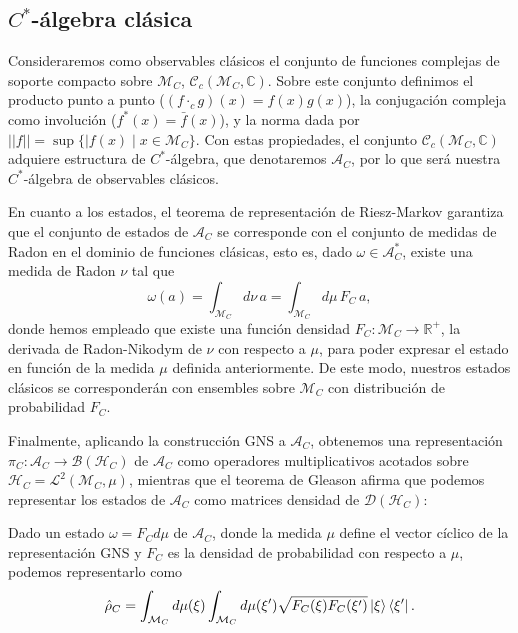 \documentclass[openany, 11pt]{book}
\numberwithin{equation}{chapter}
\newcommand{\Hc}{\mathcal H_C}
\newcommand{\Ac}{\mathcal A_C}
\newcommand{\Mc}{\mathcal M_C}
\begin{document}
\subsection{$C^*$-álgebra clásica}

Consideraremos como observables clásicos el conjunto de funciones complejas de soporte compacto sobre $\Mc$, $\mathcal C_c(\Mc, \mathbb C)$. Sobre este conjunto definimos 
el producto punto a punto ($(f\cdot_c g)(x) = f(x)g(x)$), la conjugación compleja como involución ($f^*(x) = \bar f(x)$), y la norma dada por $||f|| = \sup\{|f(x) \mid x\in\Mc\}$. 
Con estas propiedades, el conjunto $\mathcal C_c(\Mc, \mathbb C)$ adquiere estructura de $C^*$-álgebra, que denotaremos $\Ac$, por lo que será nuestra $C^*$-álgebra de observables clásicos. 

En cuanto a los estados, el teorema de representación de Riesz-Markov garantiza que el conjunto de estados de $\Ac$ se corresponde con el conjunto de medidas de Radon en el dominio de funciones clásicas, 
esto es, dado $\omega\in\Ac^*$, existe una medida de Radon $\nu$ tal que \begin{equation}
    \omega(a) = \int_{\Mc} d\nu \, a =\int_{\Mc} d\mu \, F_C \, a, 
\end{equation}donde hemos empleado que existe una función densidad $F_C:\Mc \to\mathbb R^+$, la derivada de Radon-Nikodym de $\nu$ con respecto a $\mu$, para poder expresar el estado en función de la medida 
$\mu$ definida anteriormente. De este modo, nuestros estados clásicos se corresponderán con ensembles sobre $\Mc$ con distribución de probabilidad $F_C$.

Finalmente, aplicando la construcción GNS a $\Ac$, obtenemos una representación $\pi_C: \Ac \to \mathcal B(\Hc)$ de $\Ac$ como operadores multiplicativos acotados sobre $\Hc = \mathcal L^2(\Mc, \mu)$, mientras que 
el teorema de Gleason afirma que podemos representar los estados de $\Ac$ como matrices densidad de $\mathcal D(\Hc)$: \begin{proposition}\label{representation}
    Dado un estado $\omega = F_C d\mu$ de $\Ac$, donde la medida $\mu$ define el vector cíclico de la representación GNS y $F_C$ es la densidad de probabilidad con respecto a $\mu$, podemos representarlo como\begin{equation}
        \hat \rho_C = \int_{\Mc} d\mu(\xi) \int_{\Mc}d\mu(\xi') \sqrt{F_C(\xi)F_C(\xi')}\ket{\xi}\bra{\xi'}.
    \end{equation}
\end{proposition}
\end{document}
